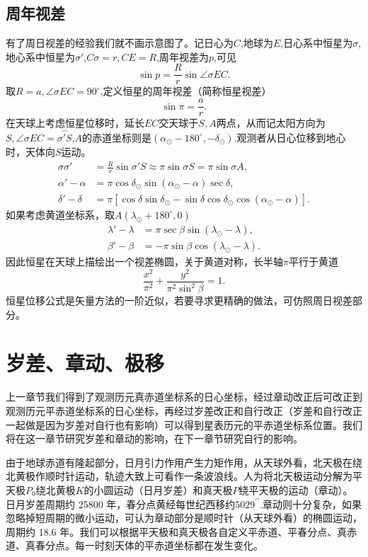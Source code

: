 \documentclass[11pt, a4paper, oneside]{ctexart}
\numberwithin{equation}{subsection}
\begin{document}
\subsection{周年视差}
有了周日视差的经验我们就不画示意图了。记日心为$C$,地球为$E$,日心系中恒星为$\sigma$,地心系中恒星为$\sigma'$,$C\sigma=r,CE=R$,周年视差为$p$,可见
\begin{equation}
\sin p=\frac{R}{r}\sin\angle{\sigma EC}.
\end{equation}
取$R=a,\angle{\sigma EC}=90^{\circ}$,定义恒星的周年视差（简称恒星视差）
\begin{equation}
\sin\pi=\frac{a}{r}.
\end{equation}
在天球上考虑恒星位移时，延长$EC$交天球于$S,A$两点，从而记太阳方向为$S,\angle{\sigma EC}=\overset{\frown}{\sigma'S}$,$A$的赤道坐标则是$\left(\alpha_{\odot}-180^{\circ},-\delta{}_{\odot}\right)$.观测者从日心位移到地心时，天体向$S$运动。
\begin{align}
\sigma\sigma'&=\frac{R}{r}\sin\sigma'S\approx\pi\sin\sigma S=\pi\sin\sigma A,\\
\alpha'-\alpha&=\pi\cos\delta_\odot\sin\left(\alpha_\odot-\alpha\right)\sec\delta,\\
\delta'-\delta&=\pi\left[\cos\delta\sin\delta_\odot-\sin\delta\cos\delta_\odot\cos\left(\alpha_\odot-\alpha\right)\right].
\end{align}
如果考虑黄道坐标系，取$A\left(\lambda_\odot+180^\circ,0\right)$
\begin{align}
\lambda'-\lambda&=\pi\sec\beta\sin\left(\lambda_\odot-\lambda\right),\\
\beta'-\beta&=-\pi\sin\beta\cos\left(\lambda_\odot-\lambda\right).
\end{align}
因此恒星在天球上描绘出一个视差椭圆，关于黄道对称，长半轴$\pi$平行于黄道
\begin{equation}
\frac{x^2}{\pi^2}+\frac{y^2}{\pi^2\sin^2\beta}=1.
\end{equation}
恒星位移公式是矢量方法的一阶近似，若要寻求更精确的做法，可仿照周日视差部分。

\section{岁差、章动、极移}
上一章节我们得到了观测历元真赤道坐标系的日心坐标，经过章动改正后可改正到观测历元平赤道坐标系的日心坐标，再经过岁差改正和自行改正（岁差和自行改正一起做是因为岁差对自行也有影响）可以得到星表历元的平赤道坐标系位置。我们将在这一章节研究岁差和章动的影响，在下一章节研究自行的影响。

由于地球赤道有隆起部分，日月引力作用产生力矩作用，从天球外看，北天极在绕北黄极作顺时针运动，轨迹大致上可看作一条波浪线。人为将北天极运动分解为平天极$P_{0}$绕北黄极$K$的小圆运动（日月岁差）和真天极$P$绕平天极的运动（章动）。日月岁差周期约 25800 年，春分点黄经每世纪西移约$5029^{\prime\prime}$.章动则十分复杂，如果忽略掉短周期的微小运动，可认为章动部分是顺时针（从天球外看）的椭圆运动，周期约 18.6 年。我们可以根据平天极和真天极各自定义平赤道、平春分点、真赤道、真春分点。每一时刻天体的平赤道坐标都在发生变化。
\end{document}
